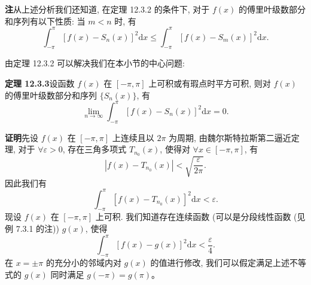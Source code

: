 \documentclass[UTF8,12pt,a4paper,fontset=fandol]{ctexart}
\begin{document}
\noindent\textbf{注}\quad 从上述分析我们还知道, 在定理 12.3.2 的条件下, 对于 $f(x)$ 的傅里叶级数部分和序列有以下性质: 当 $m<n$ 时, 有
\[
  \int_{-\pi}^{\pi}[f(x)-S_n(x)]^2\mathrm dx
  \leqslant
  \int_{-\pi}^{\pi}[f(x)-S_m(x)]^2\mathrm dx.
\]

由定理 12.3.2 可以解决我们在本小节的中心问题:

\noindent\textbf{定理 12.3.3}\quad 设函数 $f(x)$ 在 $[-\pi,\pi]$ 上可积或有瑕点时平方可积, 则对 $f(x)$ 的傅里叶级数部分和序列 $\{S_n(x)\}$, 有
\[
  \lim_{n\to\infty}\int_{-\pi}^{\pi}[f(x)-S_n(x)]^2\mathrm dx=0.
\]

\noindent\textbf{证明}\quad 先设 $f(x)$ 在 $[-\pi,\pi]$ 上连续且以 $2\pi$ 为周期, 由魏尔斯特拉斯第二逼近定理, 对于 $\forall\varepsilon>0$, 存在三角多项式 $T_{n_0}(x)$, 使得对 $\forall x\in[-\pi,\pi]$, 有
\[
  |f(x)-T_{n_0}(x)|<\sqrt{\frac{\varepsilon}{2\pi}}.
\]
因此我们有
\[
  \int_{-\pi}^{\pi}[f(x)-T_{n_0}(x)]^2\mathrm dx<\varepsilon.
\]
现设 $f(x)$ 在 $[-\pi,\pi]$ 上可积. 我们知道存在连续函数 (可以是分段线性函数 (见例 7.3.1 的注)) $g(x)$, 使得
\[
  \int_{-\pi}^{\pi}[f(x)-g(x)]^2\mathrm dx<\frac{\varepsilon}{4}.
\]
在 $x=\pm\pi$ 的充分小的邻域内对 $g(x)$ 的值进行修改, 我们可以假定满足上述不等式的 $g(x)$ 同时满足 $g(-\pi)=g(\pi)$。
\end{document}
